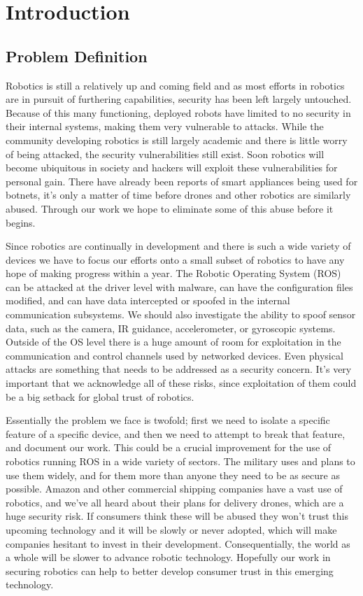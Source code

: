 \documentclass[IEEEtran,letterpaper,10pt,notitlepage,draftclsnofoot,onecolumn]{article}
\begin{document}
\newpage
{}
\tableofcontents
\clearpage

\section{Introduction}
\subsection{Problem Definition}
Robotics is still a relatively up and coming field and as most efforts in robotics are in pursuit of furthering capabilities, security has been left largely untouched. 
Because of this many functioning, deployed robots have limited to no security in their internal systems, making them very vulnerable to attacks.
While the community developing robotics is still largely academic and there is little worry of being attacked, the security vulnerabilities still exist. 
Soon robotics will become ubiquitous in society and hackers will exploit these vulnerabilities for personal gain.
There have already been reports of smart appliances being used for botnets, it's only a matter of time before drones and other robotics are similarly abused. \cite{ddos}
Through our work we hope to eliminate some of this abuse before it begins.

Since robotics are continually in development and there is such a wide variety of devices we have to focus our efforts onto a small subset of robotics to have any hope of making progress within a year. 
The Robotic Operating System (ROS) can be attacked at the driver level with malware, can have the configuration files modified, and can have data intercepted or spoofed in the internal communication subsystems.
We should also investigate the ability to spoof sensor data, such as the camera, IR guidance, accelerometer, or gyroscopic systems. 
Outside of the OS level there is a huge amount of room for exploitation in the communication and control channels used by networked devices. 
Even physical attacks are something that needs to be addressed as a security concern.
It's very important that we acknowledge all of these risks, since exploitation of them could be a big setback for global trust of robotics.

Essentially the problem we face is twofold; first we need to isolate a specific feature of a specific device, and then we need to attempt to break that feature, and document our work.
This could be a crucial improvement for the use of robotics running ROS in a wide variety of sectors.
The military uses and plans to use them widely, and for them more than anyone they need to be as secure as possible.
Amazon and other commercial shipping companies have a vast use of robotics, and we've all heard about their plans for delivery drones, which are a huge security risk.
If consumers think these will be abused they won't trust this upcoming technology and it will be slowly or never adopted, which will make companies hesitant to invest in their development.
Consequentially, the world as a whole will be slower to advance robotic technology.
Hopefully our work in securing robotics can help to better develop consumer trust in this emerging technology. 
\end{document}
